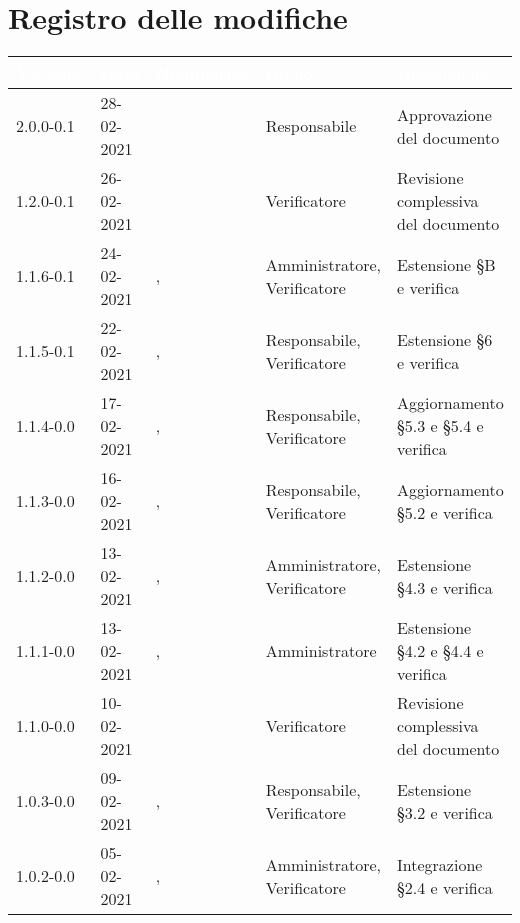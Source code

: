 \section*{Registro delle modifiche}
{
\setcounter{table}{-1}
{
\renewcommand{\arraystretch}{1.5}
\centering
\begin{longtable}{C{1.7cm} C{2.5cm} C{3.2cm} C{2.7cm} C{4.8cm}}
\textcolor{white}{\textbf{Versione}}&
\textcolor{white}{\textbf{Data}}&
\textcolor{white}{\textbf{Nominativo}}&
\textcolor{white}{\textbf{Ruolo}}&
\textcolor{white}{\textbf{Descrizione}}\\	
\endhead

2.0.0-0.1 & 28-02-2021 & \ZM{} & Responsabile & Approvazione del documento\\

1.2.0-0.1 & 26-02-2021 & \SP{} & Verificatore & Revisione complessiva del documento\\

1.1.6-0.1 & 24-02-2021 & \SG{}, \SP{} & Amministratore, Verificatore & Estensione \S B e verifica\\

1.1.5-0.1 & 22-02-2021 & \ZM{}, \SP{} & Responsabile, Verificatore & Estensione \S 6 e verifica\\

1.1.4-0.0 & 17-02-2021 & \PA{}, \ZM{} & Responsabile, Verificatore & Aggiornamento \S 5.3 e \S 5.4 e verifica\\

1.1.3-0.0 & 16-02-2021 & \PA{}, \ZM{} & Responsabile, Verificatore & Aggiornamento \S 5.2 e verifica\\

1.1.2-0.0 & 13-02-2021 & \BM{}, \ZM{} & Amministratore, Verificatore & Estensione \S 4.3 e verifica\\

1.1.1-0.0 & 13-02-2021 & \SG{}, \ZM{} & Amministratore & Estensione \S 4.2 e \S 4.4 e verifica\\

1.1.0-0.0 & 10-02-2021 & \ZM{} & Verificatore & Revisione complessiva del documento\\

1.0.3-0.0 & 09-02-2021 & \PA{}, \SP{} & Responsabile, Verificatore & Estensione \S 3.2 e verifica\\

1.0.2-0.0 & 05-02-2021& \BM{}, \SP{} & Amministratore, Verificatore & Integrazione \S 2.4 e verifica\\


\end{longtable}}}
